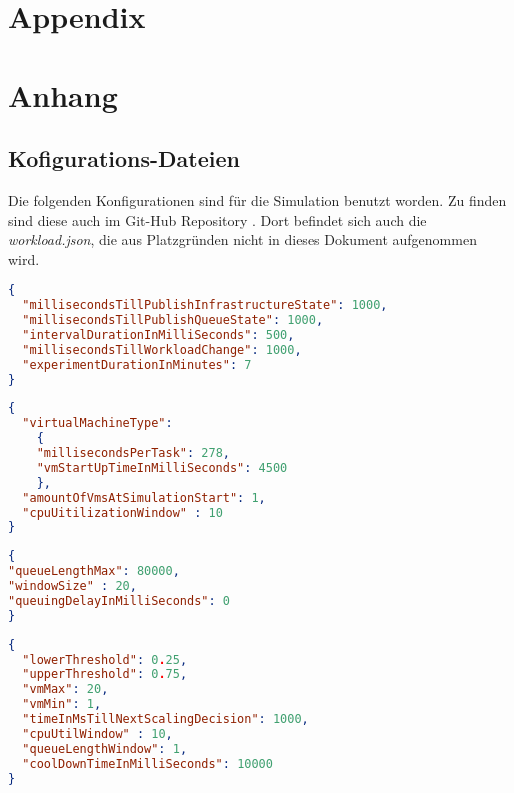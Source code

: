 
{\chapter{Appendix}}    %
{\chapter{Anhang}}      %
\label{ch:appendix}


\section{Kofigurations-Dateien }
\label{sec:appendix:BPMN Models}
Die folgenden Konfigurationen sind für die Simulation benutzt worden. Zu finden sind diese auch im Git-Hub Repository \cite{github}. Dort befindet sich auch die \textit{workload.json}, die aus Platzgründen nicht in dieses Dokument aufgenommen wird.

\begin{lstlisting}[language=json,firstnumber=1, caption={clock.json}]
{
  "millisecondsTillPublishInfrastructureState": 1000,
  "millisecondsTillPublishQueueState": 1000,
  "intervalDurationInMilliSeconds": 500,
  "millisecondsTillWorkloadChange": 1000,
  "experimentDurationInMinutes": 7
}
\end{lstlisting}

\begin{lstlisting}[language=json,firstnumber=1, caption={infrastructure.json}]
{
  "virtualMachineType": 
    {
    "millisecondsPerTask": 278,
    "vmStartUpTimeInMilliSeconds": 4500
    },
  "amountOfVmsAtSimulationStart": 1,
  "cpuUitilizationWindow" : 10
}
\end{lstlisting}

\begin{lstlisting}[language=json,firstnumber=1, caption={queue.json}]
{
"queueLengthMax": 80000,
"windowSize" : 20,
"queuingDelayInMilliSeconds": 0 
} 
\end{lstlisting}


\begin{lstlisting}[language=json,firstnumber=1, caption={autoscaler.json}]
{
  "lowerThreshold": 0.25,
  "upperThreshold": 0.75,
  "vmMax": 20,
  "vmMin": 1,
  "timeInMsTillNextScalingDecision": 1000,
  "cpuUtilWindow" : 10,
  "queueLengthWindow": 1,
  "coolDownTimeInMilliSeconds": 10000
}
\end{lstlisting}













